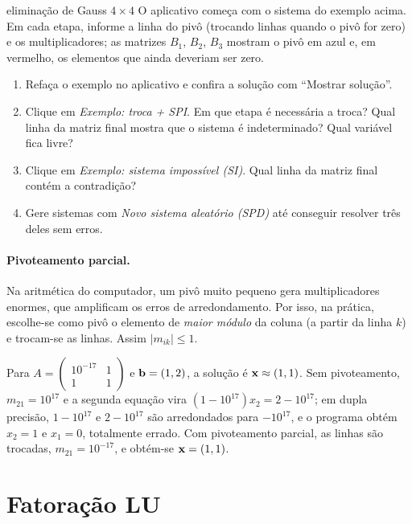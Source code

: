 \begin{atividade}{eliminação de Gauss $4\times4$}{\arqGauss}
O aplicativo começa com o sistema do exemplo acima. Em cada etapa, informe a linha do pivô
(trocando linhas quando o pivô for zero) e os multiplicadores; as matrizes $B_1$, $B_2$, $B_3$
mostram o pivô em azul e, em vermelho, os elementos que ainda deveriam ser zero.
\begin{enumerate}[nosep]
  \item Refaça o exemplo no aplicativo e confira a solução com ``Mostrar solução''.
  \item Clique em \emph{Exemplo: troca + SPI}. Em que etapa é necessária a troca? Qual linha
        da matriz final mostra que o sistema é indeterminado? Qual variável fica livre?
  \item Clique em \emph{Exemplo: sistema impossível (SI)}. Qual linha da matriz final contém a
        contradição?
  \item Gere sistemas com \emph{Novo sistema aleatório (SPD)} até conseguir resolver três deles
        sem erros.
\end{enumerate}
\end{atividade}

\paragraph{Pivoteamento parcial.} Na aritmética do computador, um pivô muito pequeno gera
multiplicadores enormes, que amplificam os erros de arredondamento. Por isso, na prática,
escolhe-se como pivô o elemento de \emph{maior módulo} da coluna (a partir da linha $k$) e
trocam-se as linhas. Assim $|m_{ik}|\le1$.

\begin{exemplo}
Para $A=\begin{pmatrix}10^{-17}&1\\1&1\end{pmatrix}$ e $\mathbf{b}=(1,2)$, a solução é
$\mathbf{x}\approx(1,1)$. Sem pivoteamento, $m_{21}=10^{17}$ e a segunda equação vira
$(1-10^{17})x_2=2-10^{17}$; em dupla precisão, $1-10^{17}$ e $2-10^{17}$ são arredondados
para $-10^{17}$, e o programa obtém $x_2=1$ e $x_1=0$, totalmente errado. Com pivoteamento
parcial, as linhas são trocadas, $m_{21}=10^{-17}$, e obtém-se $\mathbf{x}=(1,1)$.
\end{exemplo}

\section{Fatoração LU}

